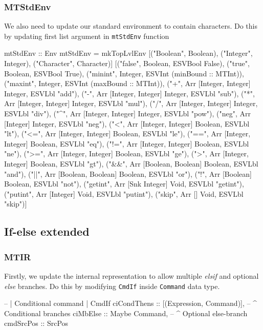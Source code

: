 \documentclass{article}
\begin{document}
\subsubsection{MTStdEnv}
\begin{flushleft}
We also need to update our standard environment to contain characters. Do this by updating first list argument in \texttt{mtStdEnv} function
\end{flushleft}
\begin{code}
mtStdEnv :: Env
mtStdEnv =
    mkTopLvlEnv
        [("Boolean",   Boolean),
         ("Integer",   Integer),
         ("Character", Character)]
        [("false",   Boolean, ESVBool False),
         ("true",    Boolean, ESVBool True),
         ("minint",  Integer, ESVInt (minBound :: MTInt)),
         ("maxint",  Integer, ESVInt (maxBound :: MTInt)),
         ("+",       Arr [Integer, Integer] Integer, ESVLbl "add"),
         ("-",       Arr [Integer, Integer] Integer, ESVLbl "sub"),
         ("*",       Arr [Integer, Integer] Integer, ESVLbl "mul"),
         ("/",       Arr [Integer, Integer] Integer, ESVLbl "div"),
         ("^",       Arr [Integer, Integer] Integer, ESVLbl "pow"),
         ("neg",     Arr [Integer] Integer,          ESVLbl "neg"),
         ("<",       Arr [Integer, Integer] Boolean, ESVLbl "lt"),
         ("<=",      Arr [Integer, Integer] Boolean, ESVLbl "le"),
         ("==",      Arr [Integer, Integer] Boolean, ESVLbl "eq"),
         ("!=",      Arr [Integer, Integer] Boolean, ESVLbl "ne"),
         (">=",      Arr [Integer, Integer] Boolean, ESVLbl "ge"),
         (">",       Arr [Integer, Integer] Boolean, ESVLbl "gt"),
         ("&&",      Arr [Boolean, Boolean] Boolean, ESVLbl "and"),
         ("||",      Arr [Boolean, Boolean] Boolean, ESVLbl "or"),
         ("!",       Arr [Boolean] Boolean,          ESVLbl "not"),
         ("getint",  Arr [Snk Integer] Void,         ESVLbl "getint"), 
         ("putint",  Arr [Integer] Void,             ESVLbl "putint"),
         ("skip",    Arr [] Void,                    ESVLbl "skip")]

\end{code}

\subsection{If-else extended}

\subsubsection{MTIR}
\begin{flushleft}
Firstly, we update the internal representation to allow multiple \textit{elsif} and optional \textit{else} branches. Do this by modifying \texttt{CmdIf} inside \texttt{Command} data type.
\end{flushleft}
\begin{code}
-- | Conditional command
| CmdIf {
      ciCondThens :: [(Expression,
                       Command)],   -- ^ Conditional branches
      ciMbElse    :: Maybe Command, -- ^ Optional else-branch
      cmdSrcPos   :: SrcPos
  }
\end{code}
\end{document}
